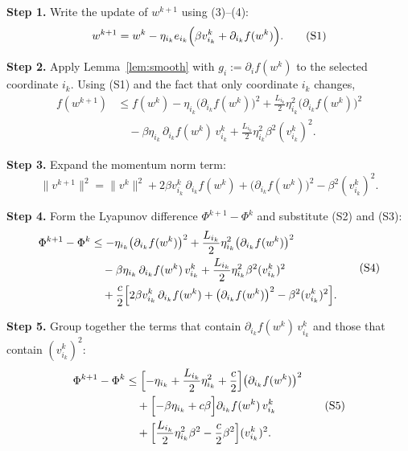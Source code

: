 \documentclass[11pt]{article}
\begin{document}
\noindent\textbf{Step 1.} Write the update of $w^{k+1}$ using (3)–(4):
\[
w^{k+1}= w^{k}-\eta_{i_k} e_{i_k}\Bigl(\beta v^{k}_{i_k}+ \partial_{i_k}f(w^{k})\Bigr).
\tag{S1}
\]

\noindent\textbf{Step 2.} Apply Lemma~\ref{lem:smooth} with $g_i:=\partial_i f(w^{k})$
to the selected coordinate $i_k$.  Using (S1) and the fact that only
coordinate $i_k$ changes,
\[
\begin{aligned}
f(w^{k+1})
&\le f(w^{k})-\eta_{i_k}\bigl(\partial_{i_k}f(w^{k})\bigr)^{2}
      +\frac{L_{i_k}}{2}\eta_{i_k}^{2}
        \bigl(\partial_{i_k}f(w^{k})\bigr)^{2}               \\
&\quad -\beta\eta_{i_k}\,\partial_{i_k}f(w^{k})\,v^{k}_{i_k}
      +\frac{L_{i_k}}{2}\eta_{i_k}^{2}\beta^{2}(v^{k}_{i_k})^{2}.
\end{aligned}
\tag{S2}
\]

\noindent\textbf{Step 3.} Expand the momentum norm term:
\[
\|v^{k+1}\|^{2}
= \|v^{k}\|^{2}+2\beta v^{k}_{i_k}\,\partial_{i_k}f(w^{k})
   +\bigl(\partial_{i_k}f(w^{k})\bigr)^{2}
   -\beta^{2}(v^{k}_{i_k})^{2}. \tag{S3}
\]

\noindent\textbf{Step 4.} Form the Lyapunov difference
$\Phi^{k+1}-\Phi^{k}$ and substitute (S2) and (S3):
\[
\begin{aligned}
\Phi^{k+1}-\Phi^{k}
&\le -\eta_{i_k}\bigl(\partial_{i_k}f(w^{k})\bigr)^{2}
   +\frac{L_{i_k}}{2}\eta_{i_k}^{2}\bigl(\partial_{i_k}f(w^{k})\bigr)^{2}  \\
&\quad -\beta\eta_{i_k}\,\partial_{i_k}f(w^{k})\,v^{k}_{i_k}
   +\frac{L_{i_k}}{2}\eta_{i_k}^{2}\beta^{2}(v^{k}_{i_k})^{2} \\
&\quad +\frac{c}{2}\Bigl[2\beta v^{k}_{i_k}\,\partial_{i_k}f(w^{k})
   +\bigl(\partial_{i_k}f(w^{k})\bigr)^{2}
   -\beta^{2}(v^{k}_{i_k})^{2}\Bigr].
\end{aligned}
\tag{S4}
\]

\noindent\textbf{Step 5.} Group together the terms that contain
$\partial_{i_k}f(w^{k})\,v^{k}_{i_k}$ and those that contain
$(v^{k}_{i_k})^{2}$:
\[
\begin{aligned}
\Phi^{k+1}-\Phi^{k}
&\le
\Bigl[-\eta_{i_k}+ \frac{L_{i_k}}{2}\eta_{i_k}^{2}
       +\frac{c}{2}\Bigr]\bigl(\partial_{i_k}f(w^{k})\bigr)^{2}   \\
&\quad +\Bigl[-\beta\eta_{i_k}
   +c\beta\Bigr]\partial_{i_k}f(w^{k})\,v^{k}_{i_k}   \\
&\quad +\Bigl[\frac{L_{i_k}}{2}\eta_{i_k}^{2}\beta^{2}
   -\frac{c}{2}\beta^{2}\Bigr](v^{k}_{i_k})^{2}.
\end{aligned}
\tag{S5}
\]
\end{document}
